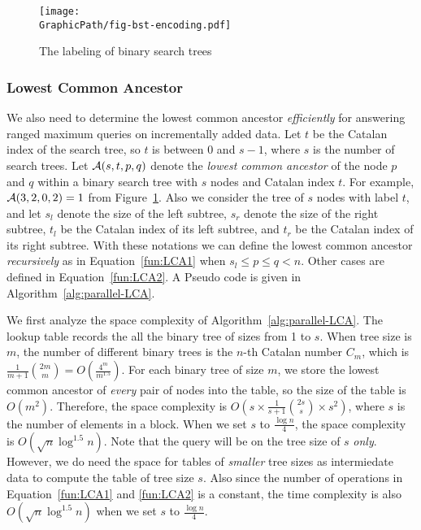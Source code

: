 \begin{figure}[!thb]
  \centering
  \texttt{[image: \\GraphicPath/fig-bst-encoding.pdf]}
  \caption{The labeling of binary search trees}
  \label{fig:labelingBST}
\end{figure}

\subsubsection{Lowest Common Ancestor}

We also need to determine the lowest common ancestor {\em efficiently}
for answering ranged maximum queries on incrementally added data.  Let
$t$ be the Catalan index of the search tree, so $t$ is between 0 and
$s - 1$, where $s$ is the number of search trees.  Let ${\cal A}(s, t,
p, q)$ denote the {\em lowest common ancestor} of the node $p$ and $q$
within a binary search tree with $s$ nodes and Catalan index $t$.  For
example, ${\cal A}(3, 2, 0, 2) = 1$ from Figure~\ref{fig:labelingBST}.
Also we consider the tree of $s$ nodes with label $t$, and let $s_l$
denote the size of the left subtree, $s_r$ denote the size of the
right subtree, $t_l$ be the Catalan index of its left subtree, and
$t_r$ be the Catalan index of its right subtree.  With these notations
we can define the lowest common ancestor {\em recursively} as in
Equation~\ref{fun:LCA1} when $s_l \le p \le q < n$.  Other cases are
defined in Equation~\ref{fun:LCA2}.  A Pseudo code is given in
Algorithm~\ref{alg:parallel-LCA}.





We first analyze the space complexity of
Algorithm~\ref{alg:parallel-LCA}.  The lookup table records the all
the binary tree of sizes from 1 to $s$.  When tree size is $m$, the
number of different binary trees is the $n$-th Catalan number $C_m$,
which is $\frac{1}{m+1}\binom{2m}{m} = O(\frac{4^m}{m^{1.5}})$.  For
each binary tree of size $m$, we store the lowest common ancestor of
{\em every} pair of nodes into the table, so the size of the table is
$O(m^2)$.  Therefore, the space complexity is $O(s \times
\frac{1}{s+1}\binom{2s}{s} \times s^2)$, where $s$ is the number of
elements in a block.  When we set $s$ to $\frac{\log n}{4}$, the space
complexity is $O(\sqrt{n} \log ^{1.5} n)$.  Note that the query will
be on the tree size of $s$ {\em only}.  However, we do need the space
for tables of {\em smaller} tree sizes as intermiedate data to compute
the table of tree size $s$.  Also since the number of operations in
Equation~\ref{fun:LCA1} and \ref{fun:LCA2} is a constant, the time
complexity is also $O(\sqrt{n} \log ^{1.5} n)$ when we set $s$ to
$\frac{\log n}{4}$.

